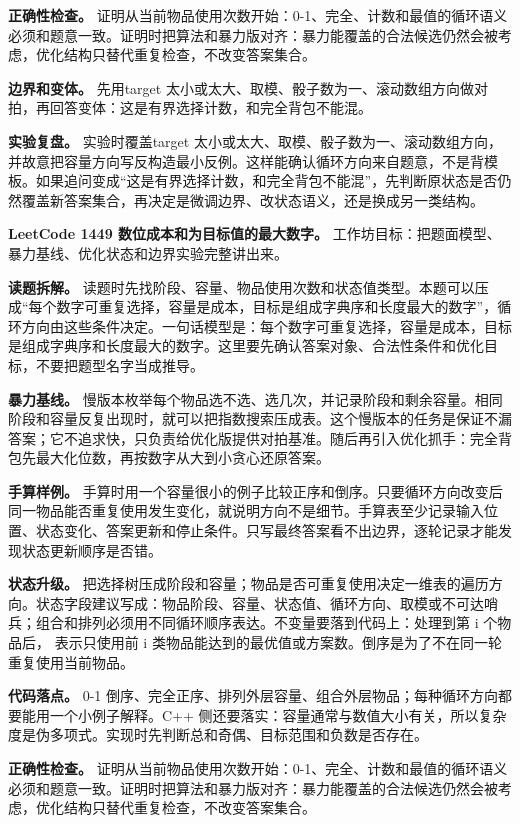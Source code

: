\textbf{正确性检查。} 证明从当前物品使用次数开始：0-1、完全、计数和最值的循环语义必须和题意一致。证明时把算法和暴力版对齐：暴力能覆盖的合法候选仍然会被考虑，优化结构只替代重复检查，不改变答案集合。

\textbf{边界和变体。} 先用target 太小或太大、取模、骰子数为一、滚动数组方向做对拍，再回答变体：这是有界选择计数，和完全背包不能混。

\textbf{实验复盘。} 实验时覆盖target 太小或太大、取模、骰子数为一、滚动数组方向，并故意把容量方向写反构造最小反例。这样能确认循环方向来自题意，不是背模板。如果追问变成“这是有界选择计数，和完全背包不能混”，先判断原状态是否仍然覆盖新答案集合，再决定是微调边界、改状态语义，还是换成另一类结构。

\noindent\textbf{LeetCode 1449 数位成本和为目标值的最大数字。} 工作坊目标：把题面模型、暴力基线、优化状态和边界实验完整讲出来。

\textbf{读题拆解。} 读题时先找阶段、容量、物品使用次数和状态值类型。本题可以压成“每个数字可重复选择，容量是成本，目标是组成字典序和长度最大的数字”，循环方向由这些条件决定。一句话模型是：每个数字可重复选择，容量是成本，目标是组成字典序和长度最大的数字。这里要先确认答案对象、合法性条件和优化目标，不要把题型名字当成推导。

\textbf{暴力基线。} 慢版本枚举每个物品选不选、选几次，并记录阶段和剩余容量。相同阶段和容量反复出现时，就可以把指数搜索压成表。这个慢版本的任务是保证不漏答案；它不追求快，只负责给优化版提供对拍基准。随后再引入优化抓手：完全背包先最大化位数，再按数字从大到小贪心还原答案。

\textbf{手算样例。} 手算时用一个容量很小的例子比较正序和倒序。只要循环方向改变后同一物品能否重复使用发生变化，就说明方向不是细节。手算表至少记录输入位置、状态变化、答案更新和停止条件。只写最终答案看不出边界，逐轮记录才能发现状态更新顺序是否错。

\textbf{状态升级。} 把选择树压成阶段和容量；物品是否可重复使用决定一维表的遍历方向。状态字段建议写成：物品阶段、容量、状态值、循环方向、取模或不可达哨兵；组合和排列必须用不同循环顺序表达。不变量要落到代码上：处理到第 i 个物品后， 表示只使用前 i 类物品能达到的最优值或方案数。倒序是为了不在同一轮重复使用当前物品。

\textbf{代码落点。} 0-1 倒序、完全正序、排列外层容量、组合外层物品；每种循环方向都要能用一个小例子解释。C++ 侧还要落实：容量通常与数值大小有关，所以复杂度是伪多项式。实现时先判断总和奇偶、目标范围和负数是否存在。

\textbf{正确性检查。} 证明从当前物品使用次数开始：0-1、完全、计数和最值的循环语义必须和题意一致。证明时把算法和暴力版对齐：暴力能覆盖的合法候选仍然会被考虑，优化结构只替代重复检查，不改变答案集合。

